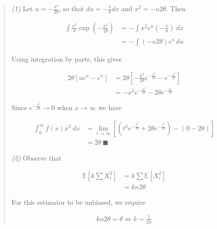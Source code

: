 \documentclass[a4paper, 12pt]{article}
\begin{document}
\small
\begin{quote}

\textit{(1)} Let $u = -\frac{x^2}{2\theta}$, so that $du = -\frac{x}{\theta}
dx$ and $x^2 = -u 2\theta$. Then

\begin{align*}
    \int \frac{x^3}{\theta} \exp\left( -\frac{x^2}{2\theta} \right) &= -\int
    x^2  e^u \left(-\frac{x}{\theta}\right) ~ dx \\ 
                                                                   &= -\int
                                                                   (-u
                                                                   2\theta)e^u
                                                                   ~ du
\end{align*}

Using integration by parts, this gives 

\begin{align*}
    2\theta \left[ ue^u - e^u \right] &= 2\theta \left[ -\frac{x^2}{2\theta}
    e^{-\frac{x^2}{2\theta}} - e^{-\frac{x^2}{2\theta}}\right]  \\ 
                                       &= -x^2 e^{-\frac{x^2}{2\theta}} -
                                       2\theta e^{-\frac{x^2}{2\theta}}
\end{align*}


Since $e^{ -\frac{x^2}{2\theta} } \to 0$ when $x \to \infty$ we have 

\begin{align*}
    \int_0^{\infty} f(x)x^2 ~ dx &= \lim_{t \to \infty} \left[ \left( t^2 e^{-\frac{t^2}{2\theta}} + 2\theta
    e^{-\frac{t^2}{2\theta}} \right)  - (0 - 2\theta)\right]  \\ 
    &= 2\theta ~ \blacksquare
\end{align*}

\textit{(2)} Observe that 

\begin{align*}
    \mathbb{E}\left[ k \sum X_i^2  \right] &= k \sum \mathbb{E}\left[ X_i^2
    \right]  \\ 
                                           &= k  n 2\theta
\end{align*}

For this estimator to be unbiased, we require 

\begin{align*}
    kn2\theta = \theta \iff k = \frac{1}{2n}
\end{align*}

\end{quote}
\normalsize
\end{document}
